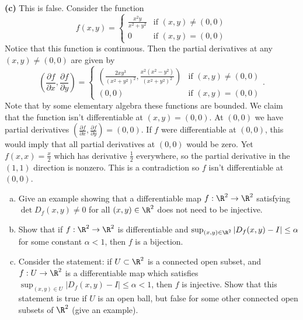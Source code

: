 \documentclass[11pt,letterpaper]{article}
\begin{document}
\begin{solution}
    \textbf{(c)} This is false. Consider the function 
    \[
        f(x,y)=\begin{cases}
            \displaystyle\frac{x^2y}{x^2+y^2}&\textrm{if }(x,y)\neq(0,0)\\
            0&\textrm{if }(x,y)=(0,0)
        \end{cases}
    \] 
    Notice that this function is continuous. Then the partial derivatives at any $(x,y)\neq (0,0)$ are given by 
    \[
        \left(\frac{\partial f}{\partial x}, \frac{\partial f}{\partial y}\right) = \begin{cases}
            \displaystyle\left(\frac{2xy^3}{(x^2+y^2)^2}, \frac{x^2(x^2-y^2)}{(x^2+y^2)^2}\right)&\textrm{if }(x,y)\neq(0,0)\\
            (0,0)&\textrm{if }(x,y)=(0,0)
        \end{cases}
    .\]
    Note that by some elementary algebra these functions are bounded. We claim that the function isn't differentiable at $(x,y)=(0,0)$. At $(0,0)$ we have partial derivatives $\left(\frac{\partial f}{\partial x}, \frac{\partial f}{\partial y}\right) = (0,0)$. If $f$ were differentiable at $(0,0)$, this would imply that all partial derivatives at $(0,0)$ would be zero. Yet $f(x,x)=\frac{x}{2}$ which has derivative $\frac{1}{2}$ everywhere, so the partial derivative in the $(1,1)$ direction is nonzero. This is a contradiction so $f$ isn't differentiable at $(0,0)$. 
\end{solution}

\begin{problem}\noindent
    \begin{enumerate}[(a)]
        \item Give an example showing that a differentiable map $f:\R^2\to \R^2$ satisfying $\det D_f(x,y)\neq 0$ for all $(x,y)\in \R^2$ does not need to be injective.        
        \item Show that if $f:\R^2\to \R^2$ is differentiable and $\sup_{(x,y)\in \R^2} |D_f(x,y)-I|\leq \alpha$ for some constant $\alpha<1$, then $f$ is a bijection. 
        \item Consider the statement: if $U\subset \R^2$ is a connected open subset, and $f:U\to\R^2$ is a differentiable map which satisfies $\sup_{(x,y)\in U} |D_f(x,y)-I|\leq \alpha<1$, then $f$ is injective. Show that this statement is true if $U$ is an open ball, but false for some other connected open subsets of $\R^2$ (give an example).
    \end{enumerate}
\end{problem}
\end{document}
